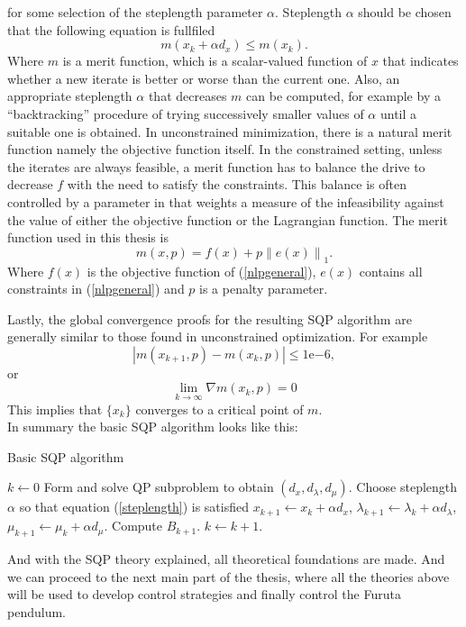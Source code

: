 for some selection of the steplength parameter $\alpha$. Steplength $\alpha$ should be chosen that the following equation is fullfiled
\begin{equation}\label{steplength}
	m(x_k + \alpha d_x)\leq m(x_k).
\end{equation}
Where $m$ is a merit function, which is a scalar-valued function of $x$ that indicates whether a new iterate is better or worse than the current one. Also, an appropriate steplength $\alpha$ that decreases $m$ can be computed, for example by a ``backtracking'' procedure of trying successively smaller values of $\alpha$ until a suitable one is obtained. In unconstrained minimization, there is a natural merit function namely the objective function itself. In the constrained setting, unless the iterates are always feasible, a merit function has to balance the drive to decrease $f$ with the need to satisfy the constraints. This balance is often controlled by a parameter in that weights a measure of the infeasibility against the value of either the objective function or the Lagrangian function. The merit function used in this thesis is
\begin{equation}
m(x,p) = f(x) + p\left\|e(x)\right\|_1.
\end{equation}
Where $f(x)$ is the objective function of (\ref{nlpgeneral}), $e(x)$ contains all constraints in (\ref{nlpgeneral}) and $p$ is a penalty parameter.

Lastly, the global convergence proofs for the resulting SQP algorithm are generally similar to those found in unconstrained optimization. For example 
\begin{equation}
	|m(x_{k+1},p) - m(x_{k},p)|\leq 1\mathrm{e}{-6},
\end{equation}
or
\begin{equation}
	\lim_{k\to\infty} \nabla m(x_{k},p) = 0
\end{equation}
This implies that $\{x_k\}$ converges to a critical point of $m$.\\

In summary the basic SQP algorithm looks like this:

\begin{algorithm}[H]
	\caption{Basic SQP algorithm}\label{SQP:algorithm}
	\begin{algorithmic}[1]
	\State $k\gets 0$
	\State Form and solve QP subproblem to obtain $(d_x,d_\lambda,d_\mu)$.
	\State Choose steplength $\alpha$ so that equation (\ref{steplength}) is satisfied
	\State 	$x_{k+1} \gets x_k + \alpha d_x$,
	\State $\lambda_{k+1} \gets \lambda_k + \alpha d_\lambda$,
	\State $\mu_{k+1} \gets \mu_k + \alpha d_\mu$.
	\State Compute $B_{k+1}$.
	\State $k \gets k+1$.
	\EndWhile
	\EndProcedure	
	\end{algorithmic}
\end{algorithm}	
And with the SQP theory explained, all theoretical foundations are made. And we can proceed to the next main part of the thesis, where all the theories above will be used to develop control strategies and finally control the Furuta pendulum.